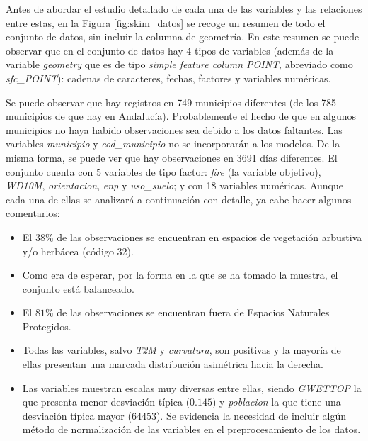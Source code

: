 \documentclass[12pt,a4paper,]{book}
\providecommand{\tightlist}{%
  \setlength{\itemsep}{0pt}\setlength{\parskip}{0pt}}
\numberwithin{dummy}{section}
\theoremstyle{ocrenumbox}
\theoremstyle{blacknumex}
\theoremstyle{blacknumbox}
\theoremstyle{ocrenum}
\theoremstyle{ocrenum}
\begin{document}
Antes de abordar el estudio detallado de cada una de las variables y las
relaciones entre estas, en la Figura \ref{fig:skim_datos} se recoge un
resumen de todo el conjunto de datos, sin incluir la columna de
geometría. En este resumen se puede observar que en el conjunto de datos
hay 4 tipos de variables (además de la variable \emph{geometry} que es
de tipo \emph{simple feature column POINT}, abreviado como
\emph{sfc\_POINT}): cadenas de caracteres, fechas, factores y variables
numéricas.

Se puede observar que hay registros en 749 municipios diferentes (de los
785 municipios de que hay en Andalucía). Probablemente el hecho de que
en algunos municipios no haya habido observaciones sea debido a los
datos faltantes. Las variables \emph{municipio} y \emph{cod\_municipio}
no se incorporarán a los modelos. De la misma forma, se puede ver que
hay observaciones en 3691 días diferentes. El conjunto cuenta con 5
variables de tipo factor: \emph{fire} (la variable objetivo),
\emph{WD10M}, \emph{orientacion}, \emph{enp} y \emph{uso\_suelo}; y con
18 variables numéricas. Aunque cada una de ellas se analizará a
continuación con detalle, ya cabe hacer algunos comentarios:

\begin{itemize}
\tightlist
\item
  El \(38\%\) de las observaciones se encuentran en espacios de
  vegetación arbustiva y/o herbácea (código 32).
\item
  Como era de esperar, por la forma en la que se ha tomado la muestra,
  el conjunto está balanceado.
\item
  El \(81\%\) de las observaciones se encuentran fuera de Espacios
  Naturales Protegidos.
\item
  Todas las variables, salvo \emph{T2M} y \emph{curvatura}, son
  positivas y la mayoría de ellas presentan una marcada distribución
  asimétrica hacia la derecha.
\item
  Las variables muestran escalas muy diversas entre ellas, siendo
  \emph{GWETTOP} la que presenta menor desviación típica (\(0.145\)) y
  \emph{poblacion} la que tiene una desviación típica mayor (\(64453\)).
  Se evidencia la necesidad de incluir algún método de normalización de
  las variables en el preprocesamiento de los datos.
\end{itemize}
\end{document}
